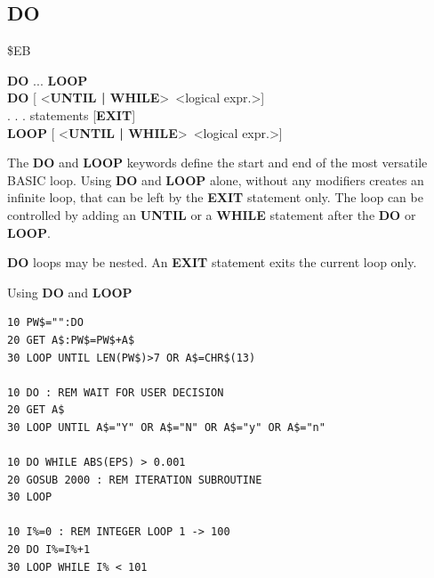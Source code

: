 \subsection{DO}
\begin{description}[leftmargin=2cm,style=nextline]
\item [Token:] \$EB
\item [Format:] {\bf DO} ... {\bf LOOP} \\
                {\bf DO} [ <{\bf UNTIL | WHILE}> <logical expr.>] \\
                . . . statements [{\bf EXIT}] \\
                {\bf LOOP} [ <{\bf UNTIL | WHILE}> <logical expr.>]
\item [Usage:] The {\bf DO} and {\bf LOOP} keywords define
               the start and end of the most versatile BASIC loop.
               Using {\bf DO} and {\bf LOOP} alone, without any
               modifiers creates an infinite loop, that can be left
               by the {\bf EXIT} statement only. The loop can be
               controlled by adding an {\bf UNTIL} or a {\bf WHILE}
               statement after the {\bf DO} or {\bf LOOP}.

\item [Remarks:] {\bf DO} loops may be nested. An {\bf EXIT} statement
               exits the current loop only.
\item [Example:] Using {\bf DO} and {\bf LOOP}
\begin{tcolorbox}[colback=black,coltext=white]
\verbatimfont{\codefont}
\begin{verbatim}
10 PW$="":DO
20 GET A$:PW$=PW$+A$
30 LOOP UNTIL LEN(PW$)>7 OR A$=CHR$(13)

10 DO : REM WAIT FOR USER DECISION
20 GET A$
30 LOOP UNTIL A$="Y" OR A$="N" OR A$="y" OR A$="n"

10 DO WHILE ABS(EPS) > 0.001
20 GOSUB 2000 : REM ITERATION SUBROUTINE
30 LOOP

10 I%=0 : REM INTEGER LOOP 1 -> 100
20 DO I%=I%+1
30 LOOP WHILE I% < 101
\end{verbatim}
\end{tcolorbox}
\end{description}


\newpage
